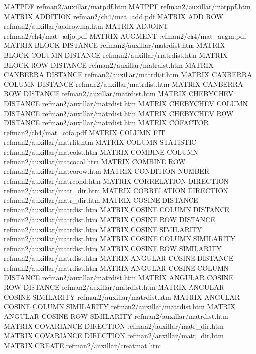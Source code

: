 MATPDF                                  refman2/auxillar/matpdf.htm
MATPPF                                  refman2/auxillar/matppf.htm
MATRIX ADDITION                         refman2/ch4/mat_add.pdf
MATRIX ADD ROW                          refman2/auxillar/addrowma.htm
MATRIX ADJOINT                          refman2/ch4/mat_adjo.pdf
MATRIX AUGMENT                          refman2/ch4/mat_augm.pdf
MATRIX BLOCK DISTANCE                   refman2/auxillar/matrdist.htm
MATRIX BLOCK COLUMN DISTANCE            refman2/auxillar/matrdist.htm
MATRIX BLOCK ROW DISTANCE               refman2/auxillar/matrdist.htm
MATRIX CANBERRA DISTANCE                refman2/auxillar/matrdist.htm
MATRIX CANBERRA COLUMN DISTANCE         refman2/auxillar/matrdist.htm
MATRIX CANBERRA ROW DISTANCE            refman2/auxillar/matrdist.htm
MATRIX CHEBYCHEV DISTANCE               refman2/auxillar/matrdist.htm
MATRIX CHEBYCHEV COLUMN DISTANCE        refman2/auxillar/matrdist.htm
MATRIX CHEBYCHEV ROW DISTANCE           refman2/auxillar/matrdist.htm
MATRIX COFACTOR                         refman2/ch4/mat_cofa.pdf
MATRIX COLUMN FIT                       refman2/auxillar/matrfit.htm
MATRIX COLUMN STATISTIC                 refman2/auxillar/matcolst.htm
MATRIX COMBINE COLUMN                   refman2/auxillar/matcocol.htm
MATRIX COMBINE ROW                      refman2/auxillar/matcorow.htm
MATRIX CONDITION NUMBER                 refman2/auxillar/matrcond.htm
MATRIX CORRELATION DIRECTION            refman2/auxillar/matr_dir.htm
MATRIX CORRELATION DIRECTION            refman2/auxillar/matr_dir.htm
MATRIX COSINE DISTANCE                  refman2/auxillar/matrdist.htm
MATRIX COSINE COLUMN DISTANCE           refman2/auxillar/matrdist.htm
MATRIX COSINE ROW DISTANCE              refman2/auxillar/matrdist.htm
MATRIX COSINE SIMILARITY                refman2/auxillar/matrdist.htm
MATRIX COSINE COLUMN SIMILARITY         refman2/auxillar/matrdist.htm
MATRIX COSINE ROW SIMILARITY            refman2/auxillar/matrdist.htm
MATRIX ANGULAR COSINE DISTANCE          refman2/auxillar/matrdist.htm
MATRIX ANGULAR COSINE COLUMN DISTANCE   refman2/auxillar/matrdist.htm
MATRIX ANGULAR COSINE ROW DISTANCE      refman2/auxillar/matrdist.htm
MATRIX ANGULAR COSINE SIMILARITY        refman2/auxillar/matrdist.htm
MATRIX ANGULAR COSINE COLUMN SIMILARITY refman2/auxillar/matrdist.htm
MATRIX ANGULAR COSINE ROW SIMILARITY    refman2/auxillar/matrdist.htm
MATRIX COVARIANCE DIRECTION             refman2/auxillar/matr_dir.htm
MATRIX COVARIANCE DIRECTION             refman2/auxillar/matr_dir.htm
MATRIX CREATE                           refman2/auxillar/creatmat.htm
